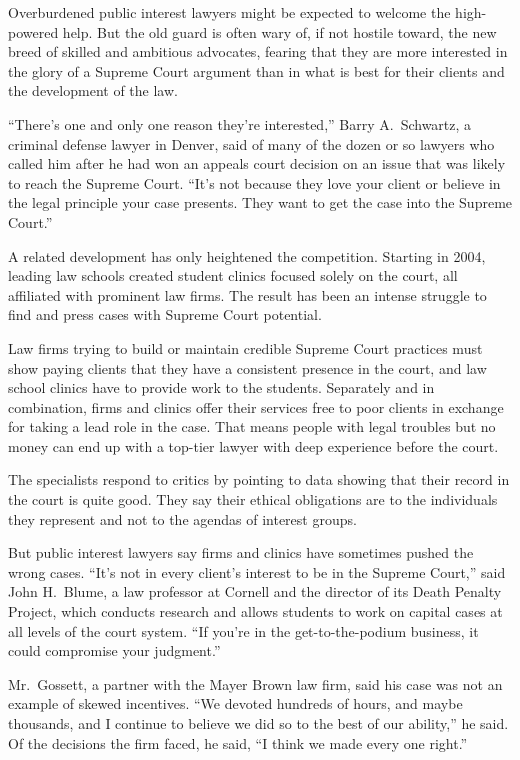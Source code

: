 ﻿\documentclass[12pt]{article}
\begin{document}
Overburdened public interest lawyers might be expected to welcome the high-powered help. But the old
guard is often wary of, if not hostile toward, the new breed of skilled and ambitious advocates,
fearing that they are more interested in the glory of a Supreme Court argument than in what is best
for their clients and the development of the law.

``There's one and only one reason they're interested,'' Barry A.~Schwartz, a criminal defense lawyer
in Denver, said of many of the dozen or so lawyers who called him after he had won an appeals court
decision on an issue that was likely to reach the Supreme Court. ``It's not because they love your
client or believe in the legal principle your case presents. They want to get the case into the
Supreme Court.''

A related development has only heightened the competition. Starting in 2004, leading law schools
created student clinics focused solely on the court, all affiliated with prominent law firms. The
result has been an intense struggle to find and press cases with Supreme Court potential.

Law firms trying to build or maintain credible Supreme Court practices must show paying clients that
they have a consistent presence in the court, and law school clinics have to provide work to the
students. Separately and in combination, firms and clinics offer their services free to poor clients
in exchange for taking a lead role in the case. That means people with legal troubles but no money
can end up with a top-tier lawyer with deep experience before the court.

The specialists respond to critics by pointing to data showing that their record in the court is
quite good. They say their ethical obligations are to the individuals they represent and not to the
agendas of interest groups.

But public interest lawyers say firms and clinics have sometimes pushed the wrong cases. ``It's not
in every client's interest to be in the Supreme Court,'' said John H.~Blume, a law professor at
Cornell and the director of its Death Penalty Project, which conducts research and allows students
to work on capital cases at all levels of the court system. ``If you're in the get-to-the-podium
business, it could compromise your judgment.''

Mr.~Gossett, a partner with the Mayer Brown law firm, said his case was not an example of skewed
incentives. ``We devoted hundreds of hours, and maybe thousands, and I continue to believe we did so
to the best of our ability,'' he said. Of the decisions the firm faced, he said, ``I think we made
every one right.''
\end{document}
